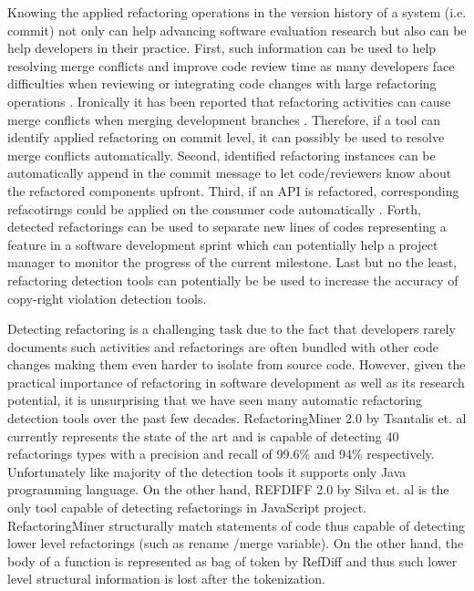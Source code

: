 \documentclass[letterpaper,12pt,onecolumn,final]{report}
\begin{document}
Knowing the applied refactoring operations in the version history of a system (i.e. commit) not only can help advancing software evaluation research but also can be help developers in their practice.  First, such information can be used to help resolving merge conflicts and improve code review time as many developers face difficulties when reviewing or integrating code changes with large refactoring operations \cite{kim2012field}. Ironically it has been reported that refactoring activities can cause merge conflicts when merging development branches \cite{mahmoudi2019refactorings}. Therefore, if a tool can identify applied refactoring on commit level, it can possibly be used to resolve merge conflicts automatically. Second, identified refactoring instances can be automatically append in the commit message to let code/reviewers know about the refactored components upfront. Third, if an API is refactored, corresponding refacotirngs could be applied on the consumer code automatically \cite{henkel2005catchup} \cite{Xing2008}. Forth, detected refactorings can be used to separate  new lines of codes representing a feature in a software development sprint which can potentially help a project manager to monitor the progress of the current milestone. Last but no the least, refactoring detection tools can potentially be be used to increase the accuracy of copy-right violation detection tools.

Detecting refactoring is a challenging task due to the fact that developers rarely documents such activities \cite{alomar2021refactoring} and refactorings are often bundled with other code changes making them even harder to isolate from source code. However, given the practical importance of refactoring in software development as well as its research potential, it is unsurprising that we have seen many automatic refactoring detection tools over the past few decades. RefactoringMiner 2.0 by Tsantalis et. al \cite{Tsantalis2020} currently represents the state of the art and is capable of detecting 40 refactorings types with a precision and recall of 99.6\% and 94\% respectively.  Unfortunately like majority of the detection tools it supports only Java programming language. On the other hand, REFDIFF 2.0 by Silva et. al  \cite{Silva2020} is the only tool capable of detecting refactorings in JavaScript project. RefactoringMiner structurally match statements of code thus capable of detecting lower level refactorings (such as rename /merge variable). On the other hand, the body of a function is represented as bag of token by RefDiff and thus such lower level structural information is lost after the tokenization.
\end{document}
